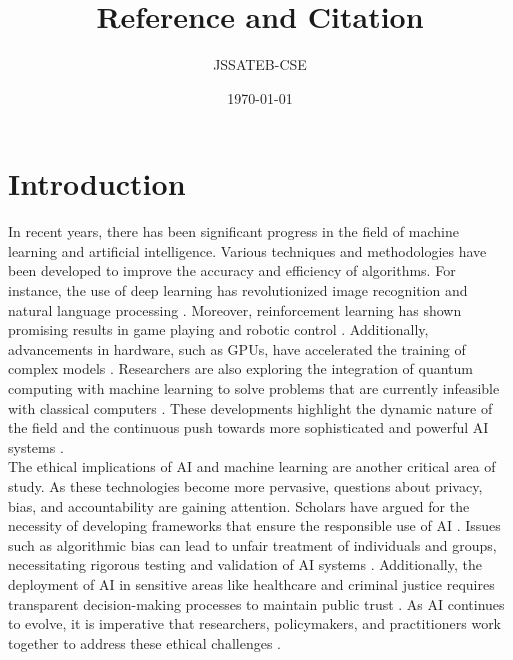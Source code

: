 \documentclass{article}
\title{Reference and Citation}
\author{JSSATEB-CSE}
\date{\today}
\begin{document}
	\maketitle
	
	\section{Introduction}
		In recent years, there has been significant progress in the field of machine learning and artificial intelligence. Various techniques and methodologies have been developed to improve the accuracy and efficiency of algorithms. For instance, the use of deep learning has revolutionized image recognition and natural language processing \cite{lecun2015deep}. Moreover, reinforcement learning has shown promising results in game playing and robotic control \citep{sutton2018reinforcement, mnih2015human}. Additionally, advancements in hardware, such as GPUs, have accelerated the training of complex models \citep{krizhevsky2012imagenet}. Researchers are also exploring the integration of quantum computing with machine learning to solve problems that are currently infeasible with classical computers \citep{biamonte2017quantum}. These developments highlight the dynamic nature of the field and the continuous push towards more sophisticated and powerful AI systems \citep{russell2016artificial}.\\
		
		The ethical implications of AI and machine learning are another critical area of study. As these technologies become more pervasive, questions about privacy, bias, and accountability are gaining attention. Scholars have argued for the necessity of developing frameworks that ensure the responsible use of AI \citep{mittelstadt2016ethics, jobin2019global}. Issues such as algorithmic bias can lead to unfair treatment of individuals and groups, necessitating rigorous testing and validation of AI systems \citep{barocas2016big}. Additionally, the deployment of AI in sensitive areas like healthcare and criminal justice requires transparent decision-making processes to maintain public trust \citep{toreini2020relationship}. As AI continues to evolve, it is imperative that researchers, policymakers, and practitioners work together to address these ethical challenges \citep{floridi2018ai}.
	
	
	
\end{document}
